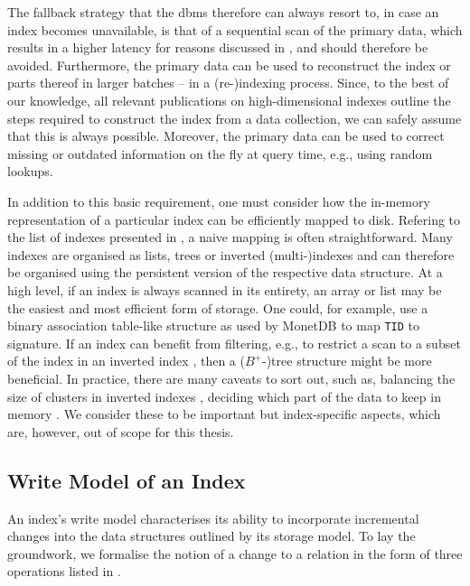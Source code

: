 The fallback strategy that the \acrshort{dbms} therefore can always resort to, in case an index becomes unavailable, is that of a sequential scan of the primary data, which results in a higher latency for reasons discussed in , and should therefore be avoided. Furthermore, the primary data can be used to reconstruct the index or parts thereof in larger batches -- in a (re-)indexing process. Since, to the best of our knowledge, all relevant publications on high-dimensional indexes outline the steps required to construct the index from a data collection, we can safely assume that this is always possible. Moreover, the primary data can be used to correct missing or outdated information on the fly at query time, e.g., using random lookups.

In addition to this basic requirement, one must consider how the in-memory representation of a particular index can be efficiently mapped to disk. Refering to the list of indexes presented in , a naive mapping is often straightforward. Many indexes are organised as lists, trees or inverted (multi-)indexes \cite{Sivic:2003Video,Babenko:2014Inverted} and can therefore be organised using the persistent version of the respective data structure. At a high level, if an index is always scanned in its entirety, an array or list may be the easiest and most efficient form of storage. One could, for example, use a binary association table-like structure as used by MonetDB \cite{Idreos:2012MonetDB} to map \texttt{TID} to signature. If an index can benefit from filtering, e.g., to restrict a scan to a subset of the index in an inverted index \cite{Chierichetti:2007Finding,Gudmundsson:2010Large,Jegou:2010Product}, then a ($B^{+}$-)tree structure might be more beneficial. In practice, there are many caveats to sort out, such as, balancing the size of clusters in inverted indexes \cite{Hojsgaard:2019Index}, deciding which part of the data to keep in memory \cite{Lejsek:2009NVTree,Jayaram:2019DiskANN,Chen:2021SPANN}. We consider these to be important but index-specific aspects, which are, however, out of scope for this thesis.

\subsection{Write Model of an Index}
An index's write model characterises its ability to incorporate incremental changes into the data structures outlined by its storage model. To lay the groundwork, we formalise the notion of a change to a relation in the form of three operations listed in . 

